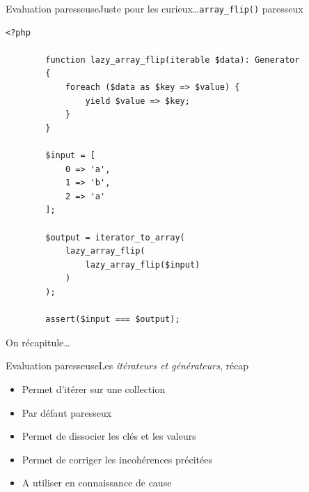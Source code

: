 \begin{frame}[fragile]{Evaluation paresseuse}{Juste pour les curieux\ldots \texttt{array\_flip()} paresseux}
    \begin{lstlisting}[firstnumber=1]
        <?php

        function lazy_array_flip(iterable $data): Generator
        {
            foreach ($data as $key => $value) {
                yield $value => $key;
            }
        }

        $input = [
            0 => 'a',
            1 => 'b',
            2 => 'a'
        ];

        $output = iterator_to_array(
            lazy_array_flip(
                lazy_array_flip($input)
            )
        );

        assert($input === $output);
    \end{lstlisting}
\end{frame}

\begin{frameC}{On récapitule\ldots}

\end{frameC}

\begin{frame}{Evaluation paresseuse}{Les \textit{itérateurs et générateurs}, récap}
    \begin{itemize}[<+->]
        \item Permet d'itérer sur une collection

        \item Par défaut paresseux

        \item Permet de dissocier les clés et les valeurs

        \item Permet de corriger les incohérences précitées

        \item A utiliser en connaissance de cause
    \end{itemize}
\end{frame}
